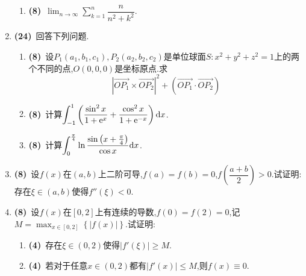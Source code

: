 \documentclass{ctexart}
\begin{document}
\begin{enumerate}[leftmargin=*,label=\textbf{\arabic*.}]
\begin{enumerate}[label=\tbf{(\arabic*)}]
            \item \textbf{(8)}\ \(\displaystyle\lim_{n\to\infty}\sum_{k=1}^{n}\dfrac{n}{n^2+k^2}\).
        \end{enumerate}
    \item \textbf{(24)}\ 回答下列问题.
        \begin{enumerate}[label=\tbf{(\arabic*)}]
            \item \textbf{(8)}\ 设$P_1(a_1,b_1,c_1),P_2(a_2,b_2,c_2)$是单位球面$S:x^2+y^2+z^2=1$上的两个不同的点,$O(0,0,0)$是坐标原点.求\[\left|\overrightarrow{OP_1}\times\overrightarrow{OP_2}\right|^2+\left(\overrightarrow{OP_1}\cdot\overrightarrow{OP_2}\right)\]
            \item \textbf{(8)}\ 计算$\displaystyle\int_{-1}^1\left(\dfrac{\sin^2x}{1+\mathrm{e}^x}+\dfrac{\cos^2x}{1+\mathrm{e}^{-x}}\right)\mathrm{d} x$.
            \item \textbf{(8)}\ 计算\(\displaystyle\int_{0}^{\frac{\pi}{4}}\ln\dfrac{\sin\left(x+\frac\pi4\right)}{\cos x}\mathrm{d} x\).
        \end{enumerate}
    \item \textbf{(8)}\ 设$f(x)$在$(a,b)$上二阶可导,$f(a)=f(b)=0$,$f\left(\dfrac{a+b}{2}\right)>0$.试证明:存在$\xi\in(a,b)$使得$f''(\xi)<0$.
    \item \textbf{(8)}\ 设$f(x)$在$[0,2]$上有连续的导数,$f(0)=f(2)=0$,记$M=\displaystyle\max_{x\in[0,2]}\left\{|f(x)|\right\}$.试证明:
        \begin{enumerate}[label=\tbf{(\arabic*)}]
            \item \textbf{(4)}\ 存在$\xi\in(0,2)$使得$\left|f'(\xi)\right|\geqslant M$.
            \item \textbf{(4)}\ 若对于任意$x\in(0,2)$都有$\left|f'(x)\right|\leqslant M$,则$f(x)\equiv0$.
        \end{enumerate}
\end{enumerate}
\end{document}
